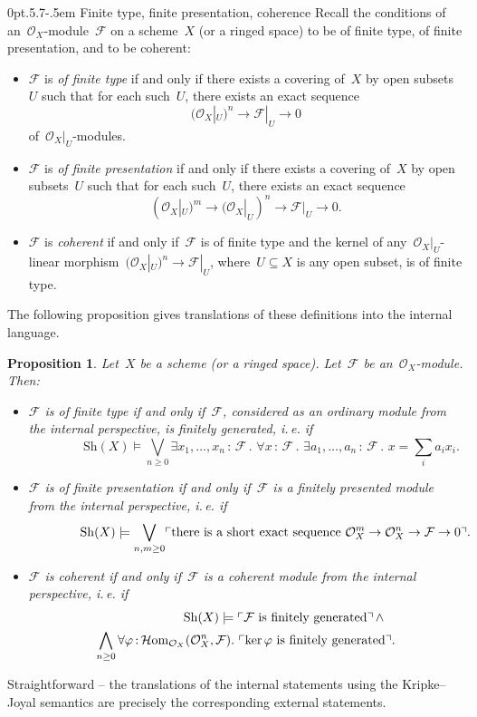 \documentclass[10pt,reqno,a4paper]{amsbook}
\makeatletter
\theoremstyle{definition}
\theoremstyle{plain}
\newtheorem{prop}[defn]{Proposition}
\theoremstyle{remark}
\newcommand{\F}{\mathcal{F}}
\renewcommand{\O}{\mathcal{O}}
\newcommand{\HOM}{\mathcal{H}\mathrm{om}}
\newcommand{\Sh}{\mathrm{Sh}}
\DeclareMathOperator{\Kernel}{ker}
\newcommand{\?}{\,{:}\,}
\renewcommand{\_}{\mathpunct{.}\,}
\newcommand{\speak}[1]{\ulcorner\text{\textnormal{#1}}\urcorner}
\newcommand{\ie}{i.\,e.\@\xspace}
\renewenvironment{proof}[1][\proofname]{\par
  \pushQED{\qed}%
  \normalfont \topsep6\p@\@plus6\p@\relax
  \trivlist
  \item[\hskip\labelsep
        \itshape
    #1\@addpunct{.}]\ignorespaces
}{%
  \popQED\endtrivlist\@endpefalse
}
\def\subsection{\@startsection{subsection}{2}%
  {0pt}{.5\linespacing\@plus.7\linespacing}{-.5em}%
  {\normalfont\bfseries}}
\makeatother
\begin{document}
\subsection{Finite type, finite presentation, coherence}
Recall the conditions of an~$\O_X$-module~$\F$ on a scheme~$X$ (or a ringed
space) to be of finite type, of finite presentation, and to be coherent:
\begin{itemize}
\item $\F$ is \emph{of finite type} if and only if there exists a covering of~$X$ by
open subsets~$U$ such that for each such~$U$, there exists an exact sequence
\[ (\O_X|_U)^n \longrightarrow \F|_U \longrightarrow 0 \]
of~$\O_X|_U$-modules.
\item $\F$ is \emph{of finite presentation} if and only if there exists a covering of~$X$ by
open subsets~$U$ such that for each such~$U$, there exists an exact sequence
\[ (\O_X|_U)^m \longrightarrow (\O_X|_U)^n \longrightarrow \F|_U \longrightarrow 0. \]
\item $\F$ is \emph{coherent} if and only if~$\F$ is of finite type and the
kernel of any~$\O_X|_U$-linear morphism~$(\O_X|_U)^n \to \F|_U$, where~$U \subseteq
X$ is any open subset, is of finite type.
\end{itemize}

The following proposition gives translations of these definitions into the
internal language.
\begin{prop}\label{prop:finite-type-and-co}
Let~$X$ be a scheme (or a ringed space). Let~$\F$ be
an~$\O_X$-module. Then:
\begin{itemize}
\item $\F$ is of finite type if and only if~$\F$, considered as an ordinary
module from the internal perspective, is finitely generated, \ie if
\[ {\qquad\qquad} \Sh(X) \models
  \bigvee_{n \geq 0}
  \exists x_1,\ldots,x_n\?\F\_
  \forall x\?\F\_
  \exists a_1,\ldots,a_n\?\F\_
  x = \textstyle\sum\limits_i a_i x_i. \]
\item $\F$ is of finite presentation if and only if~$\F$ is a finitely
presented module from the internal perspective, \ie if
\[ {\qquad\qquad} \Sh(X) \models \bigvee_{n,m \geq 0}
  \speak{there is a short exact sequence $\O_X^m \to \O_X^n \to \F \to 0$}.
  \]
\item $\F$ is coherent if and only if~$\F$ is a coherent module from the
internal perspective, \ie if
\begin{multline*}
{\qquad\qquad\qquad}
  \Sh(X) \models \speak{$\F$ is finitely generated} \mathop{\wedge} \\
  \bigwedge_{n \geq 0} \forall \varphi \? \HOM_{\O_X}(\O_X^n,\F)\_
  \speak{$\Kernel \varphi$ is finitely generated}.
\end{multline*}
\end{itemize}
\end{prop}
\begin{proof}Straightforward -- the translations of the internal statements using
the Kripke--Joyal semantics are precisely the corresponding external
statements.
\end{proof}
\end{document}
